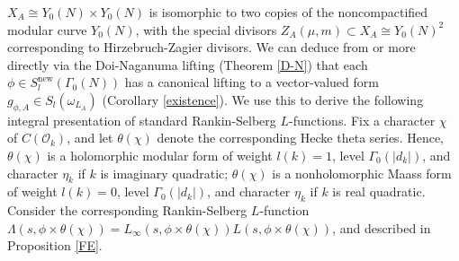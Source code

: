 \documentclass{amsart}
\theoremstyle{definition}
\theoremstyle{definition}
\theoremstyle{definition}
\begin{document}
$X_A \cong Y_0(N) \times Y_0(N)$ is isomorphic to two copies of the noncompactified modular curve $Y_0(N)$,
with the special divisors $Z_A(\mu, m) \subset X_A \cong Y_0(N)^2$ corresponding to Hirzebruch-Zagier divisors. 
We can deduce from \cite[Theorem 5.2]{Str} or more directly via the Doi-Naganuma lifting (Theorem \ref{D-N}) that each 
$\phi \in S_l^{\operatorname{new}}(\Gamma_0(N))$ has a canonical lifting to a vector-valued form $g_{\phi, A} \in S_l(\omega_{L_A})$
(Corollary \ref{existence}). We use this to derive the following integral presentation of standard Rankin-Selberg $L$-functions.
Fix a character $\chi$ of $C(\mathcal{O}_k)$, and let $\theta(\chi)$ denote the corresponding Hecke theta series. Hence,  
$\theta(\chi)$ is a holomorphic modular form of weight $l(k) = 1$, level $\Gamma_0(\vert d_k \vert)$, and character $\eta_k$ if $k$ is imaginary quadratic;
$\theta(\chi)$ is a nonholomorphic Maass form of weight $l(k)=0$, level $\Gamma_0(\vert d_k \vert)$, and character $\eta_k$ if $k$ is real quadratic.
Consider the corresponding Rankin-Selberg $L$-function $\Lambda(s, \phi \times \theta(\chi)) = L_{\infty}(s, \phi \times \theta(\chi)) L(s, \phi \times \theta(\chi))$, and described in Proposition \ref{FE}. 
\end{document}
